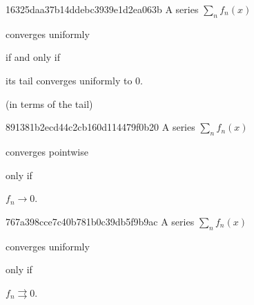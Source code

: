 \begin{note}{16325daa37b14ddebc3939e1d2ea063b}
    A series \({ \sum_n f_n(x) }\) \begin{icloze}{2}converges uniformly\end{icloze} \begin{icloze}{3}if and only if\end{icloze} \begin{icloze}{1}its tail converges uniformly to \({ 0 }\).\end{icloze}

    \begin{center}
        \tiny
        (in terms of the tail)
    \end{center}
\end{note}

\begin{note}{891381b2ecd44c2cb160d114479f0b20}
    A series \({ \sum_n f_n(x) }\) \begin{icloze}{2}converges pointwise\end{icloze} \begin{icloze}{3}only if\end{icloze} \begin{icloze}{1}\({ f_n \to 0 }\).\end{icloze}
\end{note}

\begin{note}{767a398cce7c40b781b0c39db5f9b9ac}
    A series \({ \sum_n f_n(x) }\) \begin{icloze}{2}converges uniformly\end{icloze} \begin{icloze}{3}only if\end{icloze} \begin{icloze}{1}\({ f_n \rightrightarrows 0 }\).\end{icloze}
\end{note}


